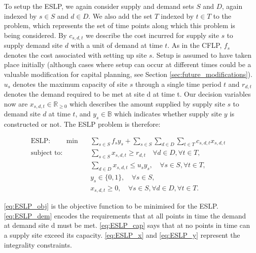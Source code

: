 To setup the ESLP, we again consider supply and demand sets $S$ and $D$, again indexed by $s \in S$ and $d \in D$. 
We also add the set $T$ indexed by $t \in T$ to the problem, which represents the set of time points along which 
this problem is being considered. By $c_{s, d, t}$ we describe the cost incurred for supply site $s$ to supply demand 
site $d$ with a unit of demand at time $t$. As in the CFLP, $f_s$ denotes the cost associated with setting up site $s$.
Setup is assumed to have taken place initially (although cases where setup can occur at different times
could be a valuable modification for capital planning, see Section \ref{sec:future_modifications}).
$u_{s}$ denotes the maximum capacity of site $s$ through a single time period $t$ and $r_{d, t}$ denotes the demand required to be met at site 
d at time t. Our decision variables now are $x_{s, d, t} \in \mathbb{R}_{\geq 0}$ which describes the amount supplied by 
supply site $s$ to demand site $d$ at time $t$, and $y_s \in \mathbb{B}$ which indicates whether supply site $y$ is 
constructed or not. The ESLP problem is therefore:

\begin{subequations}\label{eq:ESLP}
    \begin{align}
    \text{ESLP: } \quad \quad \min \quad & \sum_{s \in S} f_s y_s + \sum_{s \in S}\sum_{d \in D}\sum_{t \in T} c_{s,d,t} x_{s,d, t} \label{eq:ESLP_obj}\\
    \text{subject to: } & \sum_{s \in S} x_{s,d,t} \geq r_{d,t} \quad \forall d \in D, \forall t \in T, \label{eq:ESLP_dem}\\
    & \sum_{d \in D} x_{s,d, t} \leq u_{s} y_s, \quad \forall s \in S, \forall t \in T, \label{eq:ESLP_cap}\\
    & y_s \in \{0, 1\}, \quad \forall s \in S,\label{eq:ESLP_y}\\
    & x_{s,d,t} \geq 0, \quad \forall s \in S, \forall d \in D, \forall t \in T.\label{eq:ESLP_x}
    \end{align}
\end{subequations}

\ref{eq:ESLP_obj} is the objective function to be minimised for the ESLP. \ref{eq:ESLP_dem} encodes the requirements that
at all points in time the demand at demand site d must be met. \ref{eq:ESLP_cap} says that at no points in time can a 
supply site exceed its capacity. \ref{eq:ESLP_x} and \ref{eq:ESLP_y} represent the integrality constraints.
